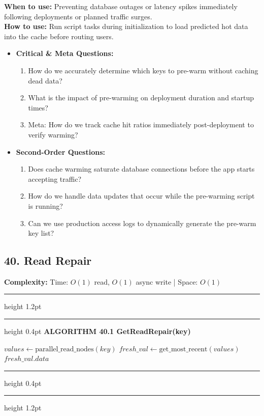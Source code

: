 \documentclass[11pt,a4paper]{article}
\newenvironment{textbookalgo}[2]{%
  \par\addvspace{1.2em}\noindent
  \hrule height 1.2pt
  \vspace{1.5pt}
  \hrule height 0.4pt
  \vspace{5pt}
  {\noindent\large\bfseries\sffamily ALGORITHM #1 \quad #2}
  \par\vspace{5pt}
  \RestyleAlgo{plain}
}{%
  \par\vspace{4pt}
  \hrule height 0.4pt
  \vspace{1.5pt}
  \hrule height 1.2pt
  \par\addvspace{1.2em}
}
\theoremstyle{definition}
\begin{document}
\noindent
\textbf{When to use:} Preventing database outages or latency spikes immediately following deployments or planned traffic surges.\\
\textbf{How to use:} Run script tasks during initialization to load predicted hot data into the cache before routing users.
\begin{itemize}[leftmargin=*]
  \item[] \textbf{Critical \& Meta Questions:}
  \begin{enumerate}
    \item How do we accurately determine which keys to pre-warm without caching dead data?
    \item What is the impact of pre-warming on deployment duration and startup times?
    \item Meta: How do we track cache hit ratios immediately post-deployment to verify warming?
  \end{enumerate}
  \item[] \textbf{Second-Order Questions:}
  \begin{enumerate}
    \item Does cache warming saturate database connections before the app starts accepting traffic?
    \item How do we handle data updates that occur while the pre-warming script is running?
    \item Can we use production access logs to dynamically generate the pre-warm key list?
  \end{enumerate}
\end{itemize}
\medskip


\clearpage
\subsection{40. Read Repair}

\noindent
\textbf{Complexity:} Time: $O(1)$ read, $O(1)$ async write | Space: $O(1)$
\smallskip

\begin{textbookalgo}{40.1}{GetReadRepair(key)}
\begin{algorithm}[H]
$values \leftarrow \text{parallel\_read\_nodes}(key)$\;
$fresh\_val \leftarrow \text{get\_most\_recent}(values)$\;
\Return $fresh\_val.data$\;
\end{algorithm}
\end{textbookalgo}
\end{document}
